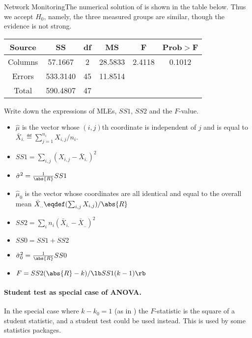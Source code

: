 \begin{exnn}{Network Monitoring}The numerical solution of
 is shown in the table below. Thus we
accept $H_0$, namely, the three measured groups are similar,
though the evidence is not strong.
 \begin{center}
  \begin{tabular}{c|c|c|c|c|c}\hline
     Source & SS & df & MS & F & Prob$>$F \\ \hline
Columns &  57.1667 & 2 &  28.5833 &   2.4118 &   0.1012 \\
Errors & 533.3140 & 45 &  11.8514 &   &   \\
Total & 590.4807 & 47 &  &   &   \\
  \end{tabular}
\end{center}
 {Write down the expressions of MLEs, $SS1$, $SS2$ and the $F$-value.}
 {\begin{itemize}
  \item $\hat{\mu}$ is the vector whose
 $(i,j)$th coordinate is independent of $j$ and is equal to
  $\bar{X}_{i.}\eqdef\sum_{j=1}^{n_i}X_{i,j}/n_i$.
  \item $SS1=\sum_{i,j}(X_{i,j}-\bar{X}_{i.})^2$
  \item $\hat{\sigma}^2=\frac{1}{\abs{R}}SS1$
  \item $\hat{\mu}_0$ is the vector whose coordinates are
      all identical and equal to the overall mean
      $\bar{X}_{..}\eqdef(\sum_{i,j}X_{i,j})/\abs{R}$
  \item $SS2=\sum_i n_i (\bar{X}_{i.}-\bar{X}_{..})^2$
  \item $SS0=SS1 + SS2$
  \item $\hat{\sigma}_0^2=\frac{1}{\abs{R}}SS0$
  \item $F=SS2 (\abs{R}-k)/\lb SS1(k-1)\rb$
\end{itemize}
 }
\end{exnn}

\paragraph{Student test as special case of ANOVA. } In the special case where $k-k_0=1$ (as in
) the $F$-statistic is the square of a student
statistic, and a student test could be used instead. This is
used by some statistics packages.

